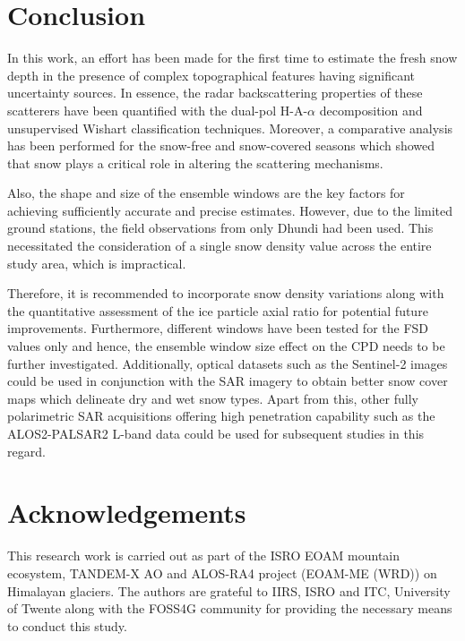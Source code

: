 \documentclass{article}
\begin{document}
\section{Conclusion}
\label{sec:concl}
In this work, an effort has been made for the first time to estimate the fresh snow depth in the presence of complex topographical features having significant uncertainty sources. In essence, the radar backscattering properties of these scatterers have been quantified with the dual-pol H-A-$\alpha$ decomposition and unsupervised Wishart classification techniques. Moreover, a comparative analysis has been performed for the snow-free and snow-covered seasons which showed that snow plays a critical role in altering the scattering mechanisms. 

Also, the shape and size of the ensemble windows are the key factors for achieving sufficiently accurate and precise estimates. However, due to the limited ground stations, the field observations from only Dhundi had been used. This necessitated the consideration of a single snow density value across the entire study area, which is impractical.

Therefore, it is recommended to incorporate snow density variations along with the quantitative assessment of the ice particle axial ratio for potential future improvements. Furthermore, different windows have been tested for the FSD values only and hence, the ensemble window size effect on the CPD needs to be further investigated. Additionally, optical datasets such as the Sentinel-2 images could be used in conjunction with the SAR imagery to obtain better snow cover maps which delineate dry and wet snow types.  Apart from this, other fully polarimetric SAR acquisitions offering high penetration capability such as the ALOS2-PALSAR2 L-band data could be used for subsequent studies in this regard. 

\section{Acknowledgements}
\label{sec: ack}
This research work is carried out as part of the ISRO EOAM mountain ecosystem, TANDEM-X AO and ALOS-RA4 project (EOAM-ME (WRD)) on Himalayan glaciers. The authors are grateful to IIRS, ISRO and ITC, University of Twente along with the FOSS4G community for providing the necessary means to conduct this study.  



\end{document}
